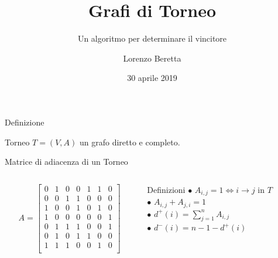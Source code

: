 \documentclass{beamer}
\title{Grafi di Torneo}
\subtitle{Un algoritmo per determinare il vincitore}
\author{Lorenzo Beretta}
\date{30 aprile 2019}
\begin{document}
\begin{frame}
	\maketitle
\end{frame}

\begin{frame}{Definizione}
	\begin{block}{Torneo}
	$T=\left(V,A\right)$ un grafo diretto e completo.
	\end{block}
	\begin{center}
	\end{center}
\end{frame}

\begin{frame}{Matrice di adiacenza di un Torneo}
	\begin{columns}
		\begin{column}{.5 \textwidth}
			\[
			A = \begin{bmatrix}
				0 & 1 & 0 & 0 & 1 & 1 & 0 \\
				0 & 0 & 1 & 1 & 0 & 0 & 0 \\
				1 & 0 & 0 & 1 & 0 & 1 & 0 \\
				1 & 0 & 0 & 0 & 0 & 0 & 1 \\
				0 & 1 & 1 & 1 & 0 & 0 & 1 \\
				0 & 1 & 0 & 1 & 1 & 0 & 0 \\
				1 & 1 & 1 & 0 & 0 & 1 & 0 \\
		    \end{bmatrix}
			\]
		\end{column}

		\begin{column}{.5 \textwidth}
			\begin{block}{Definizioni}
				\vspace{2mm}
				$\bullet$ $ A_{i,j} = 1 \iff i \longrightarrow j \text{ in } T $ \\
				\vspace{2mm}
				$\bullet$ $ A_{i,j} + A_{j, i} = 1 $ \\
				\vspace{2mm}
				$\bullet$ $ d^+(i) = \sum\limits_{j = 1}^n A_{i, j} $ \\
				\vspace{2mm}
				$\bullet$ $ d^-(i) = n - 1 - d^+(i) $ \\
				\vspace{2mm}
			\end{block}
		\end{column}
	\end{columns}
\end{frame}
\end{document}
